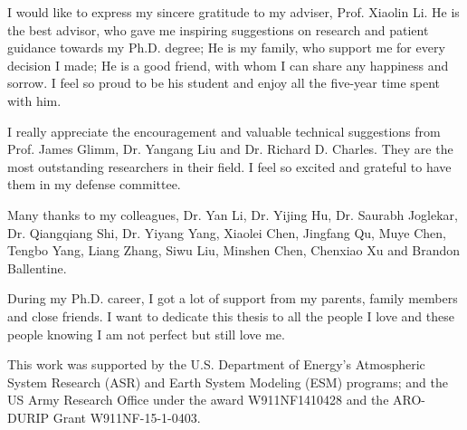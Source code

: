 \begin{spacing}{1.2}
I would like to express my sincere gratitude to my adviser, Prof. 
Xiaolin Li. He is the best advisor, who gave me inspiring suggestions
on research and patient guidance towards my Ph.D. degree; He is my family, who 
support me for every decision I made; He is a good friend, with whom I can share
any happiness and sorrow. I feel so proud to be his student and enjoy all the
five-year time spent with him.

I really appreciate the encouragement and valuable technical suggestions from
Prof. James Glimm, Dr. Yangang Liu and Dr. Richard D. Charles.
They are the most outstanding researchers in their field. I feel so
excited and grateful to have them in my defense committee.  

Many thanks to my colleagues, Dr. Yan Li, Dr. Yijing Hu, Dr.  Saurabh Joglekar, Dr. Qiangqiang Shi, 
Dr. Yiyang Yang, Xiaolei Chen, Jingfang Qu, Muye Chen, 
Tengbo Yang, Liang Zhang, Siwu Liu, Minshen Chen, Chenxiao Xu and Brandon Ballentine.

During my Ph.D. career, I got a lot of support from my parents, family 
members and close friends. I want to dedicate this thesis to all the people
I love and these people knowing I am not perfect but still love me.

This work was supported by the U.S. Department of Energy's Atmospheric System Research (ASR) and Earth System Modeling (ESM) programs;
and the US Army Research Office under the award W911NF1410428 and the ARO-DURIP Grant W911NF-15-1-0403.

\end{spacing}
